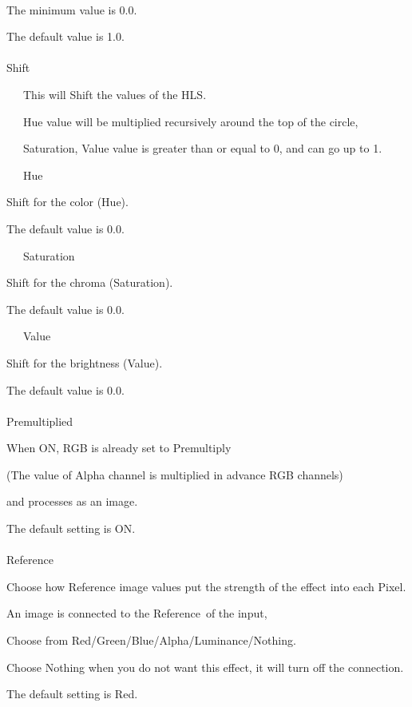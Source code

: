 \documentclass[a4paper,12pt]{article}
\begin{document}
\newpage

\thispagestyle{empty}

\ \vspace{-0.2em}
\par
The minimum value is 0.0.\par
The default value is 1.0.\\
\\
Shift\par
\noindent \ \ \, This will Shift the values of the HLS.\par
\noindent \ \ \, Hue value will be multiplied recursively around the top of the circle,\par
\noindent \ \ \, Saturation, Value value is greater than or equal to 0, and can go up to 1.\\
\par
\noindent \ \ \, Hue\par
Shift for the color (Hue).\par
The default value is 0.0.\par
\noindent \ \ \, Saturation\par
Shift for the chroma (Saturation).\par
The default value is 0.0.\par
\noindent \ \ \, Value\par
Shift for the brightness (Value).\par
The default value is 0.0.\\
\\
Premultiplied\par
When ON, RGB is already set to Premultiply\par
(The value of Alpha channel is multiplied in advance RGB channels)\par
and processes as an image.\par
The default setting is ON.\\
\\
Reference\par
Choose how Reference image values put the strength of the effect into each Pixel.\par
An image is connected to the \textquotedbl Reference\textquotedbl \ of the input,\par
Choose from Red/Green/Blue/Alpha/Luminance/Nothing.\par
Choose Nothing when you do not want this effect, it will turn off the connection.\par
The default setting is Red.
\end{document}

